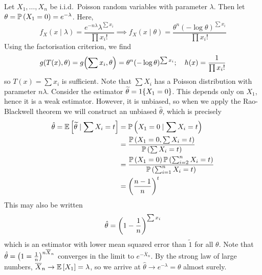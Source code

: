 \begin{example}
	Let \( X_1, \dots, X_n \) be i.i.d.\ Poisson random variables with parameter \( \lambda \).
	Then let \( \theta = \mathbb{P}\left({X_1 = 0}\right) = e^{-\lambda} \).
	Here,
	\[ f_X(x \mid \lambda) = \frac{e^{-n \lambda} \lambda^{\sum x_i}}{\prod x_i!} \implies f_X(x \mid \theta) = \frac{\theta^n (-\log \theta)^{\sum x_i}}{\prod x_i!} \]
	Using the factorisation criterion, we find
	\[ g(T(x), \theta) = g\qty(\sum x_i, \theta) = \theta^n (-\log\theta)^{\sum x_i};\quad h(x) = \frac{1}{\prod x_i!} \]
	so \( T(x) = \sum x_i \) is sufficient.
	Note that \( \sum X_i \) has a Poisson distribution with parameter \( n \lambda \).
	Consider the estimator \( \widetilde \theta = 1\qty{X_1 = 0} \).
	This depends only on \( X_1 \), hence it is a weak estimator.
	However, it is unbiased, so when we apply the Rao-Blackwell theorem we will construct an unbiased \( \hat \theta \), which is precisely
	\begin{align*}
		\hat \theta = \mathbb{E}\left[{\widetilde \theta \mid \sum X_i = t}\right] &= \mathbb{P}\left({X_1 = 0 \mid \sum X_i = t}\right) \\
		&= \frac{\mathbb{P}\left({X_1 = 0, \sum X_i = t}\right)}{\mathbb{P}\left({\sum X_i = t}\right)} \\
		&= \frac{\mathbb{P}\left({X_1 = 0}\right)\mathbb{P}\left({\sum_{i=2}^n X_i = t}\right)}{\mathbb{P}\left({\sum_{i=1}^n X_i = t}\right)} \\
		&= \qty(\frac{n-1}{n})^t
	\end{align*}
	This may also be written
	\[ \hat \theta = \qty(1 - \frac{1}{n})^{\sum x_i} \]
	which is an estimator with lower mean squared error than \( \widetilde 1 \) for all \( \theta \).
	Note that \( \hat \theta = \qty(1 = \frac{1}{n})^{n \overline X_n} \) converges in the limit to \( e^{-\overline X_n} \).
	By the strong law of large numbers, \( \overline X_n \to \mathbb{E}\left[{X_1}\right] = \lambda \), so we arrive at \( \hat \theta \to e^{-\lambda} = \theta \) almost surely.
\end{example}
